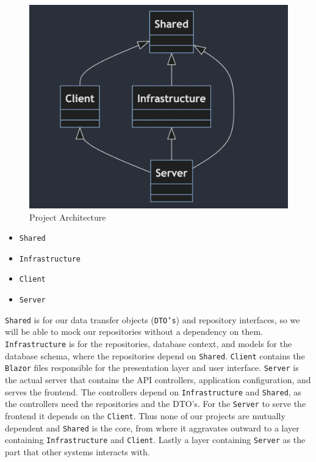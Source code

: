 \begin{figure}
    \includegraphics[width=0.9\linewidth]{Images/onionStructure.png} 
    \caption{Project Architecture}
    \label{fig:projectDependencyGraph}
\end{figure}

\begin{itemize}
    \item \texttt{Shared}
    \item \texttt{Infrastructure}
    \item \texttt{Client}
    \item \texttt{Server}
\end{itemize}

\texttt{Shared} is for our data transfer objects (\texttt{DTO's}) and repository interfaces, so we will be able to mock our repositories without a dependency on them. \texttt{Infrastructure} is for the repositories, database context, and models for the database schema, where the repositories depend on \texttt{Shared}. \texttt{Client} contains the \texttt{Blazor} files responsible for the presentation layer and user interface. \texttt{Server} is the actual server that contains the API controllers, application configuration, and serves the frontend. The controllers depend on \texttt{Infrastructure} and \texttt{Shared}, as the controllers need the repositories and the DTO's. For the \texttt{Server} to serve the frontend it depends on the \texttt{Client}. Thus none of our projects are mutually dependent and \texttt{Shared} is the core, from where it aggravates outward to a layer containing \texttt{Infrastructure} and \texttt{Client}. Lastly a layer containing \texttt{Server} as the part that other systems interacts with.

